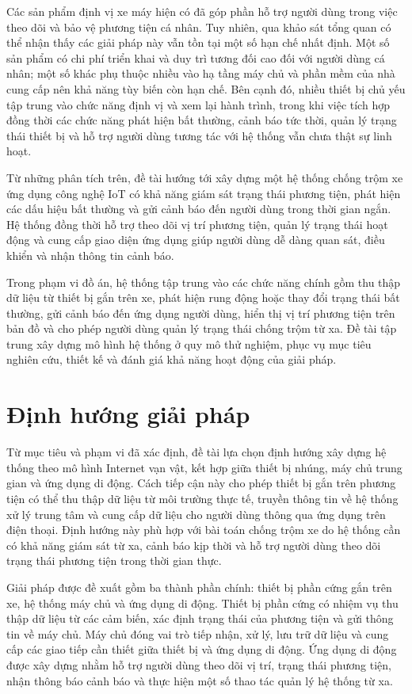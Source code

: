 \documentclass[../DoAn.tex]{subfiles}
\begin{document}
Các sản phẩm định vị xe máy hiện có đã góp phần hỗ trợ người dùng trong việc theo dõi và bảo vệ phương tiện cá nhân. Tuy nhiên, qua khảo sát tổng quan có thể nhận thấy các giải pháp này vẫn tồn tại một số hạn chế nhất định. Một số sản phẩm có chi phí triển khai và duy trì tương đối cao đối với người dùng cá nhân; một số khác phụ thuộc nhiều vào hạ tầng máy chủ và phần mềm của nhà cung cấp nên khả năng tùy biến còn hạn chế. Bên cạnh đó, nhiều thiết bị chủ yếu tập trung vào chức năng định vị và xem lại hành trình, trong khi việc tích hợp đồng thời các chức năng phát hiện bất thường, cảnh báo tức thời, quản lý trạng thái thiết bị và hỗ trợ người dùng tương tác với hệ thống vẫn chưa thật sự linh hoạt.

Từ những phân tích trên, đề tài hướng tới xây dựng một hệ thống chống trộm xe ứng dụng công nghệ IoT có khả năng giám sát trạng thái phương tiện, phát hiện các dấu hiệu bất thường và gửi cảnh báo đến người dùng trong thời gian ngắn. Hệ thống đồng thời hỗ trợ theo dõi vị trí phương tiện, quản lý trạng thái hoạt động và cung cấp giao diện ứng dụng giúp người dùng dễ dàng quan sát, điều khiển và nhận thông tin cảnh báo.

Trong phạm vi đồ án, hệ thống tập trung vào các chức năng chính gồm thu thập dữ liệu từ thiết bị gắn trên xe, phát hiện rung động hoặc thay đổi trạng thái bất thường, gửi cảnh báo đến ứng dụng người dùng, hiển thị vị trí phương tiện trên bản đồ và cho phép người dùng quản lý trạng thái chống trộm từ xa. Đề tài tập trung xây dựng mô hình hệ thống ở quy mô thử nghiệm, phục vụ mục tiêu nghiên cứu, thiết kế và đánh giá khả năng hoạt động của giải pháp. 

\section{Định hướng giải pháp}
\label{section:1.3}
Từ mục tiêu và phạm vi đã xác định, đề tài lựa chọn định hướng xây dựng hệ thống theo mô hình Internet vạn vật, kết hợp giữa thiết bị nhúng, máy chủ trung gian và ứng dụng di động. Cách tiếp cận này cho phép thiết bị gắn trên phương tiện có thể thu thập dữ liệu từ môi trường thực tế, truyền thông tin về hệ thống xử lý trung tâm và cung cấp dữ liệu cho người dùng thông qua ứng dụng trên điện thoại. Định hướng này phù hợp với bài toán chống trộm xe do hệ thống cần có khả năng giám sát từ xa, cảnh báo kịp thời và hỗ trợ người dùng theo dõi trạng thái phương tiện trong thời gian thực.

Giải pháp được đề xuất gồm ba thành phần chính: thiết bị phần cứng gắn trên xe, hệ thống máy chủ và ứng dụng di động. Thiết bị phần cứng có nhiệm vụ thu thập dữ liệu từ các cảm biến, xác định trạng thái của phương tiện và gửi thông tin về máy chủ. Máy chủ đóng vai trò tiếp nhận, xử lý, lưu trữ dữ liệu và cung cấp các giao tiếp cần thiết giữa thiết bị và ứng dụng di động. Ứng dụng di động được xây dựng nhằm hỗ trợ người dùng theo dõi vị trí, trạng thái phương tiện, nhận thông báo cảnh báo và thực hiện một số thao tác quản lý hệ thống từ xa.
\end{document}
